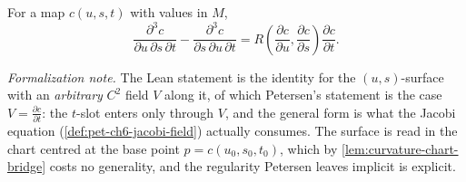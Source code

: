 \begin{lemma}
  \label{lem:pet-ch6-third-partial-commutator}
  \leanok
  For a map $c(u,s,t)$ with values in $M$,
  \[
    \frac{\partial^3c}{\partial u\,\partial s\,\partial t}
    -\frac{\partial^3c}{\partial s\,\partial u\,\partial t}
    =R\!\left(\frac{\partial c}{\partial u},\frac{\partial c}{\partial s}\right)
    \frac{\partial c}{\partial t}.
  \]

  \emph{Formalization note.} The Lean statement is the identity for the
  $(u,s)$-surface with an \emph{arbitrary} $C^2$ field $V$ along it, of which
  Petersen's statement is the case $V=\frac{\partial c}{\partial t}$: the $t$-slot
  enters only through $V$, and the general form is what the Jacobi equation
  (\cref{def:pet-ch6-jacobi-field}) actually consumes. The surface is read in the
  chart centred at the base point $p=c(u_0,s_0,t_0)$, which by
  \cref{lem:curvature-chart-bridge} costs no generality, and the regularity Petersen
  leaves implicit is explicit.
\end{lemma}
